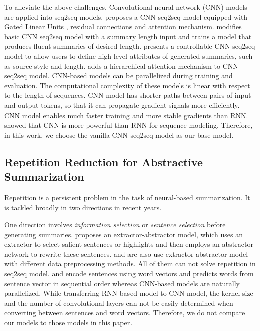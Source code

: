 \documentclass{nle}
\theoremstyle{definition}
\begin{document}
To alleviate the above challenges,
Convolutional neural network (CNN) 
models~\citep{gehring2017convs2s,FanGA18,LiuLZ18,Zhang2019AbstractTS} 
are applied into seq2seq models.
\cite{gehring2017convs2s} proposes a CNN seq2seq model equipped with
Gated Linear Units \citep{DauphinFAG17}, residual connections \citep{HeZRS16}
and attention mechanism. 
\cite{LiuLZ18} modifies basic CNN seq2seq model with a summary length
input and trains a model that produces fluent summaries of desired length.
\cite{FanGA18} presents a controllable CNN seq2seq model to
allow users to define high-level attributes of generated
summaries, such as source-style and length.
\cite{Zhang2019AbstractTS} adds a hierarchical attention mechanism to CNN seq2seq model.
CNN-based models can be parallelized during
training and evaluation. The computational complexity of
these models is linear with respect to the length of sequences.
CNN model has shorter paths between pairs of input and
output tokens, so that it can propagate gradient signals more
efficiently.
CNN model enables much faster training and more stable gradients 
than RNN. 
\cite{bai2018empirical} showed that CNN is more powerful than 
RNN for sequence modeling.
Therefore, in this work, we choose the vanilla CNN seq2seq model as 
our base model.

\subsection{Repetition Reduction for Abstractive Summarization}
Repetition is a persistent problem in the task of 
neural-based summarization. 
It is tackled broadly in two directions in recent years. 

One direction involves {\em information selection} or 
{\em sentence selection} before generating summaries.
\cite{P18-1063} proposes an extractor-abstractor model, which uses an extractor  
to select salient sentences or highlights and then employs 
an abstractor network to rewrite these sentences.
\cite{SharmaHHW19} and \cite{SanghwanB19} are also use extractor-abstractor model 
with different data preprocessing methods.
All of them can not solve repetition in seq2seq model.
\cite{TanWX17} and \cite{D18-1205,D18-1441} encode
sentences using word vectors
and predicts words from sentence vector in sequential order 
whereas CNN-based models are naturally parallelized. 
While transferring RNN-based model to CNN model, 
the kernel size and the number of 
convolutional layers can not be easily determined when
converting between sentences and word vectors. 
Therefore, we do not compare our models to those models in this paper. 
\end{document}
